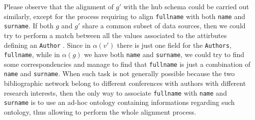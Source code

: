 \begin{example}[continues=ex:examplegraphdata,label=ex:examplereferencedOcaml]

Please observe that the alignment of $g'$ with the hub schema could be carried out similarly, except for the process requiring to align \texttt{fullname} with both \texttt{name} and \texttt{surname}. If both $g$ and $g'$ share a common subset of data sources, then we could try to perform a match between all the values associated to the attirbutes defining an \texttt{Author} \cite{Jagadish}. Since in $\alpha(v')$ there is just one field for the \texttt{Authors}, \texttt{fullname}, while in $\alpha(g)$ we have both \texttt{name} and \texttt{surname}, we could  try to find some correspondencies and manage to find that \texttt{fullname} is just a combination of \texttt{name} and \texttt{surname}. When such task is not generally possible because the two bibliographic network belong to different conferences with authors with different research interests, then the only way to associate \texttt{fullname} with \texttt{name} and \texttt{surname} is to use an ad-hoc ontology containing informations regarding such ontology, thus allowing to perform the whole alignment process.
\end{example}

